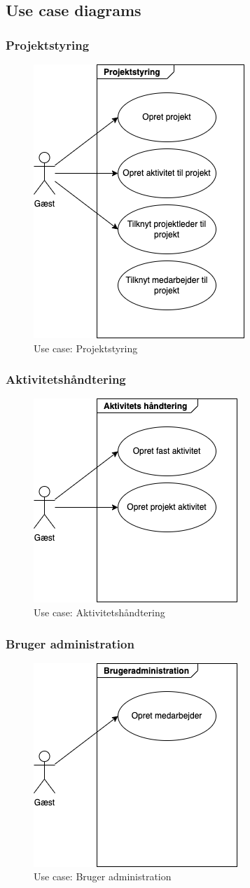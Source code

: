 \subsection{Use case diagrams}
\subsubsection{Projektstyring}

\begin{figure}[H]
    \centering
    \caption{Use case: Projektstyring}\label{fig:Projektstyring}
    \includegraphics[width=.3\textwidth]{Diagrams/guest_project}
\end{figure}

\subsubsection{Aktivitetshåndtering}

\begin{figure}[H]
    \centering
    \caption{Use case: Aktivitetshåndtering}\label{fig:Aktivitetshaandtering}
    \includegraphics[width=.3\textwidth]{Diagrams/guest_activity}
\end{figure}

\subsubsection{Bruger administration}

\begin{figure}[H]
    \centering
    \caption{Use case: Bruger administration}\label{fig:BrugerAdmin}
    \includegraphics[width=.3\textwidth]{Diagrams/guest_users}
\end{figure}

